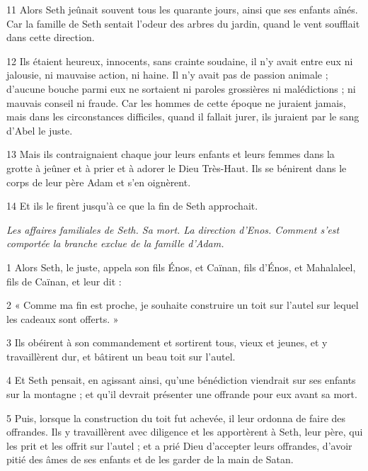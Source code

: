 \par 11 Alors Seth jeûnait souvent tous les quarante jours, ainsi que ses enfants aînés. Car la famille de Seth sentait l'odeur des arbres du jardin, quand le vent soufflait dans cette direction.

\par 12 Ils étaient heureux, innocents, sans crainte soudaine, il n'y avait entre eux ni jalousie, ni mauvaise action, ni haine. Il n'y avait pas de passion animale ; d'aucune bouche parmi eux ne sortaient ni paroles grossières ni malédictions ; ni mauvais conseil ni fraude. Car les hommes de cette époque ne juraient jamais, mais dans les circonstances difficiles, quand il fallait jurer, ils juraient par le sang d'Abel le juste.

\par 13 Mais ils contraignaient chaque jour leurs enfants et leurs femmes dans la grotte à jeûner et à prier et à adorer le Dieu Très-Haut. Ils se bénirent dans le corps de leur père Adam et s'en oignèrent.

\par 14 Et ils le firent jusqu'à ce que la fin de Seth approchait.


\par \textit{Les affaires familiales de Seth. Sa mort. La direction d'Enos. Comment s'est comportée la branche exclue de la famille d'Adam.}

\par 1 Alors Seth, le juste, appela son fils Énos, et Caïnan, fils d'Énos, et Mahalaleel, fils de Caïnan, et leur dit :

\par 2 « Comme ma fin est proche, je souhaite construire un toit sur l'autel sur lequel les cadeaux sont offerts. »

\par 3 Ils obéirent à son commandement et sortirent tous, vieux et jeunes, et y travaillèrent dur, et bâtirent un beau toit sur l'autel.

\par 4 Et Seth pensait, en agissant ainsi, qu'une bénédiction viendrait sur ses enfants sur la montagne ; et qu'il devrait présenter une offrande pour eux avant sa mort.

\par 5 Puis, lorsque la construction du toit fut achevée, il leur ordonna de faire des offrandes. Ils y travaillèrent avec diligence et les apportèrent à Seth, leur père, qui les prit et les offrit sur l'autel ; et a prié Dieu d'accepter leurs offrandes, d'avoir pitié des âmes de ses enfants et de les garder de la main de Satan.

